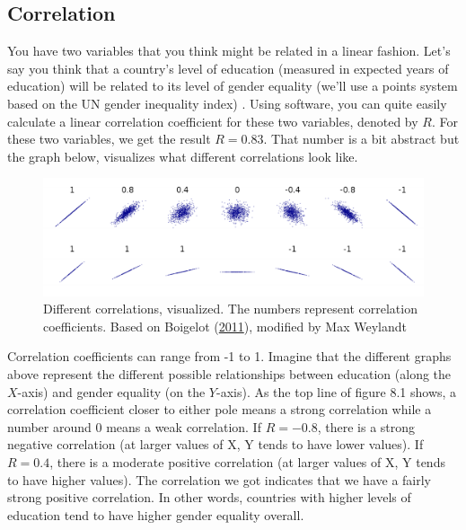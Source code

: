 \documentclass{book}
\begin{document}
\hypertarget{correlation}{%
\subsection{Correlation}\label{correlation}}

You have two variables that you think might be related in a linear fashion.
Let's say you think that a country's level of education (measured in expected
years of education) will be related to its level of gender equality (we'll use
a points system based on the UN gender inequality index) . Using software, you
can quite easily calculate a linear correlation coefficient for these two
variables, denoted by \(R\). For these two variables, we get the result
\(R=0.83.\) That number is a bit abstract but the graph below, visualizes what
different correlations look like.

\begin{figure}
\centering
\includegraphics{images/largen/correlation.png}
\caption{Different correlations, visualized. The numbers represent correlation
coefficients. Based on Boigelot
(\protect\hyperlink{ref-boigelotdenisExampleCorrelationVarious2011}{2011}),
modified by Max Weylandt}
\end{figure}

Correlation coefficients can range from -1 to 1. Imagine that the different
graphs above represent the different possible relationships between education
(along the \(X\)-axis) and gender equality (on the \(Y\)-axis). As the top
line of figure 8.1 shows, a correlation coefficient closer to either pole
means a strong correlation while a number around 0 means a weak correlation.
If \(R=-0.8\), there is a strong negative correlation (at larger values of X,
Y tends to have lower values). If \(R=0.4\), there is a moderate positive
correlation (at larger values of X, Y tends to have higher values). The
correlation we got indicates that we have a fairly strong positive
correlation. In other words, countries with higher levels of education tend to
have higher gender equality overall.
\end{document}
